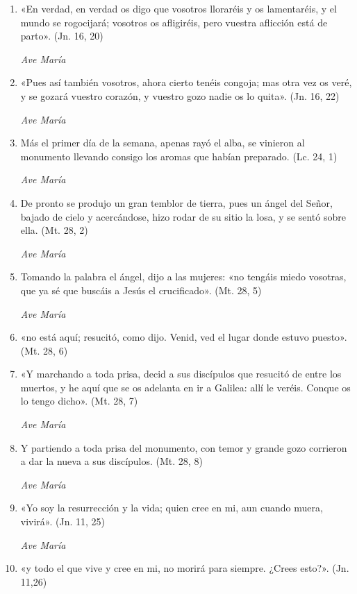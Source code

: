 \documentclass[a4paper,11pt, oneside]{report}
\begin{document}
        \begin{enumerate}
          
          \item «En verdad, en verdad os digo que vosotros lloraréis y os lamentaréis, y el mundo se rogocijará;
          vosotros os afligiréis, pero vuestra aflicción está de parto». (Jn. 16, 20)

          \textit{Ave María}

          \item «Pues así también vosotros, ahora cierto tenéis congoja; mas otra vez os veré, y se gozará vuestro corazón,
          y vuestro gozo nadie os lo quita». (Jn. 16, 22)

          \textit{Ave María}

          \item Más el primer día de la semana, apenas rayó el alba, se vinieron al monumento llevando consigo los aromas
          que habían preparado. (Lc. 24, 1)

          \textit{Ave María}

          \item De pronto se produjo un gran temblor de tierra, pues un ángel del Señor, bajado de cielo y acercándose, hizo rodar
          de su sitio la losa, y se sentó sobre ella. (Mt. 28, 2)
          
          \textit{Ave María}

          \item Tomando la palabra el ángel, dijo a las mujeres: «no tengáis miedo vosotras, que ya sé que buscáis a Jesús el crucificado». (Mt. 28, 5)

          \textit{Ave María}

          \item «no está aquí; resucitó, como dijo. Venid, ved el lugar donde estuvo puesto». (Mt. 28, 6)

          \item «Y marchando a toda prisa, decid a sus discípulos que resucitó de entre los muertos, y he aquí que se os adelanta en ir a Galilea:
          allí le veréis. Conque os lo tengo dicho». (Mt. 28, 7)

          \textit{Ave María}

          \item Y partiendo a toda prisa del monumento, con temor y grande gozo corrieron a dar la nueva a sus discípulos. (Mt. 28, 8)

          \textit{Ave María}

          \item «Yo soy la resurrección y la vida; quien cree en mi, aun cuando muera, vivirá». (Jn. 11, 25)

          \textit{Ave María}

          \item «y todo el que vive y cree en mi, no morirá para siempre. ¿Crees esto?». (Jn. 11,26)
          
        \end{enumerate}
\end{document}
